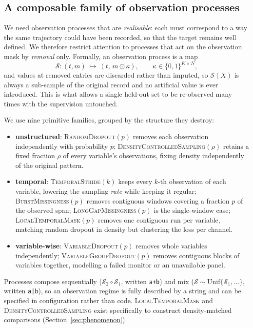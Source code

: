 \documentclass[sigconf,nonacm]{acmart}
\newcommand{\Sobs}{\mathcal{S}}
\begin{document}
\subsection{A composable family of observation processes}
\label{sec:family}
We need observation processes that are \emph{realisable}: each must correspond to a way the same trajectory
could have been recorded, so that the target remains well defined. We therefore restrict attention to processes
that act on the observation mask by \emph{removal} only. Formally, an observation process is a map
\begin{equation}
\Sobs:(t,m)\ \mapsto\ (t,\,m\odot\kappa),\qquad \kappa\in\{0,1\}^{K\times N},
\end{equation}
and values at removed entries are discarded rather than imputed, so $\Sobs(X)$ is always a sub-sample of the
original record and no artificial value is ever introduced. This is what allows a single held-out set to be
re-observed many times with the supervision untouched.

We use nine primitive families, grouped by the structure they destroy:
\begin{itemize}
\item \textbf{unstructured}: \textsc{RandomDropout}$(p)$ removes each observation independently with
probability $p$; \textsc{DensityControlledSampling}$(\rho)$ retains a fixed fraction $\rho$ of every variable's
observations, fixing density independently of the original pattern.
\item \textbf{temporal}: \textsc{TemporalStride}$(k)$ keeps every $k$-th observation of each variable, lowering
the sampling \emph{rate} while keeping it regular; \textsc{BurstMissingness}$(p)$ removes contiguous windows
covering a fraction $p$ of the observed span; \textsc{LongGapMissingness}$(p)$ is the single-window case;
\textsc{LocalTemporalMask}$(p)$ removes one contiguous run per variable, matching random dropout in density but
clustering the loss per channel.
\item \textbf{variable-wise}: \textsc{VariableDropout}$(p)$ removes whole variables independently;
\textsc{VariableGroupDropout}$(p)$ removes contiguous blocks of variables together, modelling a failed
monitor or an unavailable panel.
\end{itemize}
Processes compose sequentially ($\Sobs_2\circ\Sobs_1$, written \texttt{a+b}) and mix
($\Sobs\sim\mathrm{Unif}\{\Sobs_1,\dots\}$, written \texttt{a|b}), so an observation regime is fully described by
a string and can be specified in configuration rather than code. \textsc{LocalTemporalMask} and
\textsc{DensityControlledSampling} exist specifically to construct density-matched comparisons
(Section~\ref{sec:phenomenon}).
\end{document}
